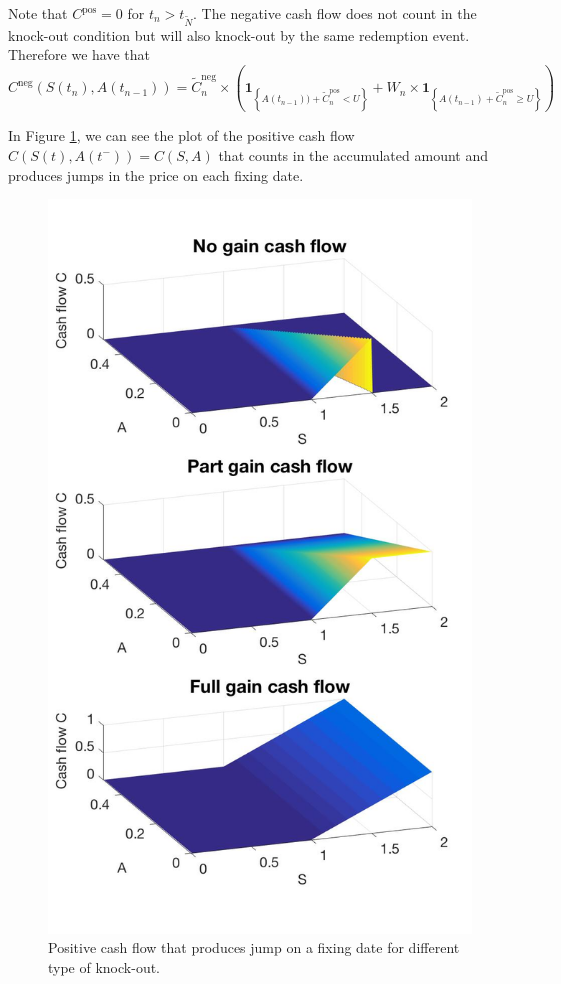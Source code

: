 Note that $C^\text{pos}=0$ for $t_n>t_{\tilde{N}}$. The negative cash flow does not count in the knock-out condition but will also knock-out by the same redemption event. Therefore we have that
\begin{equation}\label{eq:TARN:loss}
C^\text{neg}(S(t_n),A(t_{n-1})) = \tilde{C}_n^\text{neg}\times \left(\mathbf{1}_{\left\{A(t_{n-1}))+\tilde{C}^\text{pos}_n<U\right\}}+W_n\times\mathbf{1}_{\left\{A(t_{n-1})+\tilde{C}^\text{pos}_n\geq U\right\}}\right)
\end{equation}

In Figure \ref{fig:cash-flow}, we can see the plot of the positive cash flow $C(S(t),A(t^-)) = C(S,A)$ that counts in the accumulated amount and produces jumps in the price on each fixing date.
\begin{figure}[!htb]
\centering
	\includegraphics[scale = 0.25]{gfx/Cash-flow}
	\caption{Positive cash flow that produces jump on a fixing date for different type of knock-out.}
	\label{fig:cash-flow}
\end{figure}


